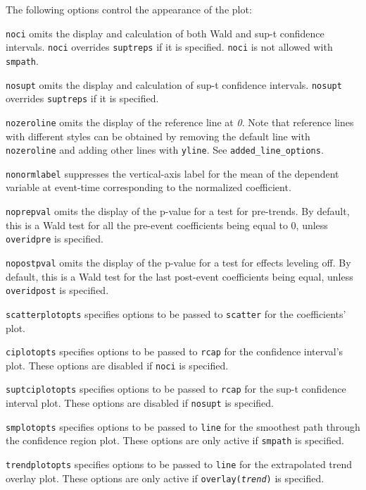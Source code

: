 \documentclass[bib]{./sty/statapress}
\begin{document}
\hangpara
The following options control the appearance of the plot:

\hangpara
\texttt{noci} omits the display and calculation of both Wald and sup-t confidence intervals. \texttt{noci} overrides \texttt{suptreps} if it is specified.  \texttt{noci} is not allowed with \texttt{smpath}.

\hangpara
\texttt{nosupt} omits the display and calculation of sup-t confidence intervals. \texttt{nosupt} overrides \texttt{suptreps} if it is specified.

\hangpara
\texttt{nozeroline} omits the display of the reference line at {\it 0}. Note that reference lines with different styles can be obtained by removing the default line with \texttt{nozeroline} and adding other lines with \texttt{yline}. See \texttt{added\_line\_options}.

\hangpara
\texttt{nonormlabel} suppresses the vertical-axis label for the mean of the dependent variable at event-time corresponding to the normalized coefficient.

\hangpara
\texttt{noprepval} omits the display of the p-value for a test for pre-trends.
By default, this is a Wald test for all the pre-event coefficients being equal to $0$, unless \texttt{overidpre} is specified.

\hangpara
\texttt{nopostpval} omits the display of the p-value for a test for effects leveling off.
By default, this is a Wald test for the last post-event coefficients being equal, unless \texttt{overidpost} is specified.

\hangpara
\texttt{scatterplotopts} specifies options to be passed to \texttt{scatter} for the coefficients' plot.

\hangpara
\texttt{ciplotopts} specifies options to be passed to \texttt{rcap} for the confidence interval's plot.
These options are disabled if \texttt{noci} is specified.

\hangpara
\texttt{suptciplotopts} specifies options to be passed to \texttt{rcap} for the sup-t confidence interval plot.
These options are disabled if \texttt{nosupt} is specified.

\hangpara
\texttt{smplotopts} specifies options to be passed to \texttt{line} for the smoothest path through the confidence region plot.
These options are only active if \texttt{smpath} is specified.

\hangpara
\texttt{trendplotopts} specifies options to be passed to \texttt{line} for the extrapolated trend overlay plot.
These options are only active if \texttt{overlay({\it trend})} is specified.
\end{document}
